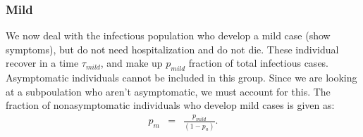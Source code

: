 \documentclass[notitlepage, superscriptaddress]{revtex4-2}
\begin{document}

\subsubsection{Mild}
We now deal with the infectious population who develop a mild case (show symptoms), but do not need hospitalization and do not die. These individual recover in a time $\tau_{mild}$, and make up $p_{mild}$ fraction of total infectious cases. Asymptomatic individuals cannot be included in this group. Since we are looking at a subpoulation who aren't asymptomatic, we must account for this. The fraction of nonasymptomatic individuals who develop mild cases is given as:
\begin{eqnarray}
p_{m} &=& \frac{p_{mild}}{(1 - p_{a})}. 
\end{eqnarray}
\end{document}
